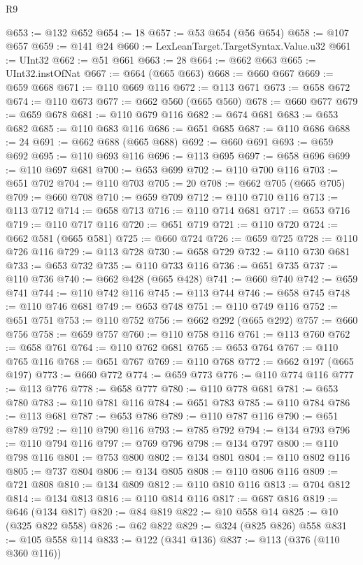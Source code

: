 \begin{lexlean}{R9}
\begin{coremodule}
@653 := @132 @652
@654 := 18
@657 := @53 @654 (@56 @654)
@658 := @107 @657
@659 := @141 @24
@660 := LexLeanTarget.TargetSyntax.Value.u32
@661 := UInt32
@662 := @51 @661
@663 := 28
@664 := @662 @663
@665 := UInt32.instOfNat
@667 := @664 (@665 @663)
@668 := @660 @667
@669 := @659 @668
@671 := @110 @669 @116
@672 := @113 @671
@673 := @658 @672
@674 := @110 @673
@677 := @662 @560 (@665 @560)
@678 := @660 @677
@679 := @659 @678
@681 := @110 @679 @116
@682 := @674 @681
@683 := @653 @682
@685 := @110 @683 @116
@686 := @651 @685
@687 := @110 @686
@688 := 24
@691 := @662 @688 (@665 @688)
@692 := @660 @691
@693 := @659 @692
@695 := @110 @693 @116
@696 := @113 @695
@697 := @658 @696
@699 := @110 @697 @681
@700 := @653 @699
@702 := @110 @700 @116
@703 := @651 @702
@704 := @110 @703
@705 := 20
@708 := @662 @705 (@665 @705)
@709 := @660 @708
@710 := @659 @709
@712 := @110 @710 @116
@713 := @113 @712
@714 := @658 @713
@716 := @110 @714 @681
@717 := @653 @716
@719 := @110 @717 @116
@720 := @651 @719
@721 := @110 @720
@724 := @662 @581 (@665 @581)
@725 := @660 @724
@726 := @659 @725
@728 := @110 @726 @116
@729 := @113 @728
@730 := @658 @729
@732 := @110 @730 @681
@733 := @653 @732
@735 := @110 @733 @116
@736 := @651 @735
@737 := @110 @736
@740 := @662 @428 (@665 @428)
@741 := @660 @740
@742 := @659 @741
@744 := @110 @742 @116
@745 := @113 @744
@746 := @658 @745
@748 := @110 @746 @681
@749 := @653 @748
@751 := @110 @749 @116
@752 := @651 @751
@753 := @110 @752
@756 := @662 @292 (@665 @292)
@757 := @660 @756
@758 := @659 @757
@760 := @110 @758 @116
@761 := @113 @760
@762 := @658 @761
@764 := @110 @762 @681
@765 := @653 @764
@767 := @110 @765 @116
@768 := @651 @767
@769 := @110 @768
@772 := @662 @197 (@665 @197)
@773 := @660 @772
@774 := @659 @773
@776 := @110 @774 @116
@777 := @113 @776
@778 := @658 @777
@780 := @110 @778 @681
@781 := @653 @780
@783 := @110 @781 @116
@784 := @651 @783
@785 := @110 @784
@786 := @113 @681
@787 := @653 @786
@789 := @110 @787 @116
@790 := @651 @789
@792 := @110 @790 @116
@793 := @785 @792
@794 := @134 @793
@796 := @110 @794 @116
@797 := @769 @796
@798 := @134 @797
@800 := @110 @798 @116
@801 := @753 @800
@802 := @134 @801
@804 := @110 @802 @116
@805 := @737 @804
@806 := @134 @805
@808 := @110 @806 @116
@809 := @721 @808
@810 := @134 @809
@812 := @110 @810 @116
@813 := @704 @812
@814 := @134 @813
@816 := @110 @814 @116
@817 := @687 @816
@819 := @646 (@134 @817)
@820 := @84 @819
@822 := @10 @558 @14
@825 := @10 (@325 @822 @558)
@826 := @62 @822
@829 := @324 (@825 @826) @558
@831 := @105 @558 @114
@833 := @122 (@341 @136)
@837 := @113 (@376 (@110 @360 @116))

\end{coremodule}
\end{lexlean}
